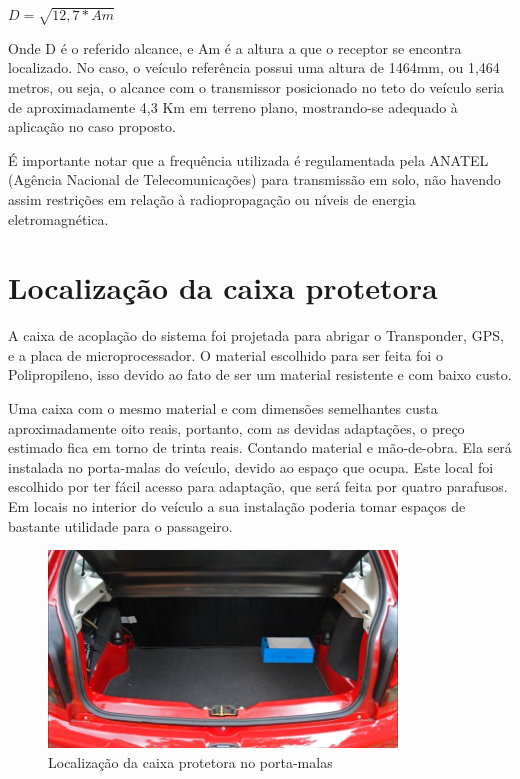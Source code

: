 \centerline{$ D = \sqrt{12,7 * Am}$}

Onde D é o referido alcance, e Am é a altura a que o receptor se encontra localizado. No caso, o veículo referência possui uma altura de 1464mm, ou 1,464 metros, ou seja, o alcance com o transmissor posicionado no teto do veículo seria de aproximadamente 4,3 Km em terreno plano, mostrando-se adequado à aplicação no caso proposto.

É importante notar que a frequência utilizada é regulamentada pela ANATEL (Agência Nacional de Telecomunicações) para transmissão em solo, não havendo assim restrições em relação à radiopropagação ou níveis de energia eletromagnética.


\section{Localização da caixa protetora}

A caixa de acoplação do sistema foi projetada para abrigar o Transponder, GPS, e a placa de microprocessador. O material escolhido para ser feita foi o Polipropileno, isso devido ao fato de ser um material resistente e com baixo custo. 

Uma caixa com o mesmo material e com dimensões semelhantes custa aproximadamente oito reais, portanto, com as devidas adaptações, o preço estimado fica em torno de trinta reais. Contando material e mão-de-obra. 
Ela será instalada no porta-malas do veículo, devido ao espaço que ocupa. Este local foi escolhido por ter fácil acesso para adaptação, que será feita por quatro parafusos. Em locais no interior do veículo a sua instalação poderia tomar espaços de bastante utilidade para o passageiro.

\begin{figure}[h]
  \centering
  \includegraphics[width=350px, scale=1]{figuras/bagageiro}
  \caption{Localização da caixa protetora no porta-malas}
\label{fig:bagageiro}
\end{figure}

